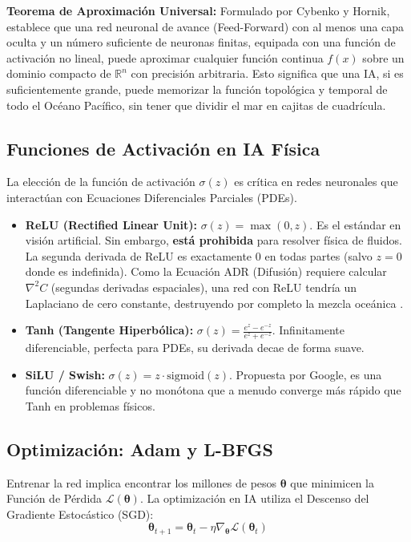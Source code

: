 \documentclass[11pt,a4paper]{article}
\begin{document}
\textbf{Teorema de Aproximación Universal:} Formulado por Cybenko y Hornik, establece que una red neuronal de avance (Feed-Forward) con al menos una capa oculta y un número suficiente de neuronas finitas, equipada con una función de activación no lineal, puede aproximar cualquier función continua $f(x)$ sobre un dominio compacto de $\mathbb{R}^n$ con precisión arbitraria. Esto significa que una IA, si es suficientemente grande, puede memorizar la función topológica y temporal de todo el Océano Pacífico, sin tener que dividir el mar en cajitas de cuadrícula.

\subsection{Funciones de Activación en IA Física}
La elección de la función de activación $\sigma(z)$ es crítica en redes neuronales que interactúan con Ecuaciones Diferenciales Parciales (PDEs).
\begin{itemize}
    \item \textbf{ReLU (Rectified Linear Unit):} $\sigma(z) = \max(0, z)$. Es el estándar en visión artificial. Sin embargo, \textbf{está prohibida} para resolver física de fluidos. La segunda derivada de ReLU es exactamente $0$ en todas partes (salvo $z=0$ donde es indefinida). Como la Ecuación ADR (Difusión) requiere calcular $\nabla^2 C$ (segundas derivadas espaciales), una red con ReLU tendría un Laplaciano de cero constante, destruyendo por completo la mezcla oceánica \cite{li2024}.
    \item \textbf{Tanh (Tangente Hiperbólica):} $\sigma(z) = \frac{e^z - e^{-z}}{e^z + e^{-z}}$. Infinitamente diferenciable, perfecta para PDEs, su derivada decae de forma suave.
    \item \textbf{SiLU / Swish:} $\sigma(z) = z \cdot \text{sigmoid}(z)$. Propuesta por Google, es una función diferenciable y no monótona que a menudo converge más rápido que Tanh en problemas físicos.
\end{itemize}

\subsection{Optimización: Adam y L-BFGS}
Entrenar la red implica encontrar los millones de pesos $\boldsymbol{\theta}$ que minimicen la Función de Pérdida $\mathcal{L}(\boldsymbol{\theta})$. 
La optimización en IA utiliza el Descenso del Gradiente Estocástico (SGD):
\begin{equation}
\boldsymbol{\theta}_{t+1} = \boldsymbol{\theta}_t - \eta \nabla_{\boldsymbol{\theta}} \mathcal{L}(\boldsymbol{\theta}_t)
\end{equation}
\end{document}
